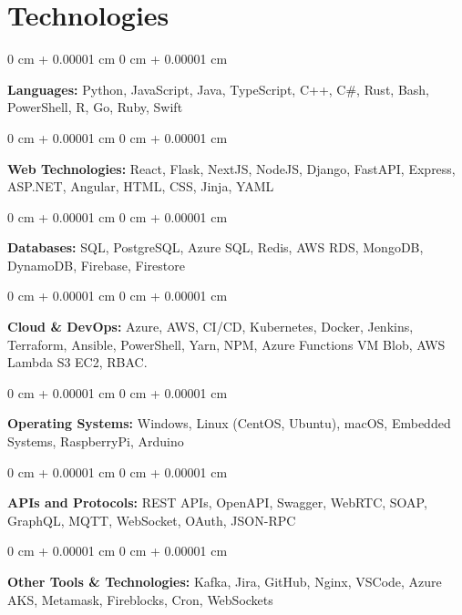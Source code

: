 \documentclass[10pt, letterpaper]{article}
\newenvironment{onecolentry}{
    \begin{adjustwidth}{
        0 cm + 0.00001 cm
    }{
        0 cm + 0.00001 cm
    }
}{
    \end{adjustwidth}
} %
\begin{document}
\section{Technologies}
\begin{onecolentry}
  \textbf{Languages:} Python, JavaScript, Java, TypeScript, C++, C\#, Rust, Bash, PowerShell, R, Go, Ruby, Swift
\end{onecolentry}
\begin{onecolentry}
  \textbf{Web Technologies:} React, Flask, NextJS, NodeJS, Django, FastAPI, Express, ASP.NET, Angular, HTML, CSS, Jinja, YAML
\end{onecolentry}
\begin{onecolentry}
  \textbf{Databases:} SQL, PostgreSQL, Azure SQL, Redis, AWS RDS, MongoDB, DynamoDB, Firebase, Firestore
\end{onecolentry}
\begin{onecolentry}
  \textbf{Cloud \& DevOps:} Azure, AWS, CI/CD, Kubernetes, Docker, Jenkins, Terraform, Ansible, PowerShell, Yarn, NPM, Azure Functions VM Blob, AWS Lambda S3 EC2, RBAC.
\end{onecolentry}
\begin{onecolentry}
  \textbf{Operating Systems:} Windows, Linux (CentOS, Ubuntu), macOS, Embedded Systems, RaspberryPi, Arduino
\end{onecolentry}
\begin{onecolentry}
  \textbf{APIs and Protocols:} REST APIs, OpenAPI, Swagger, WebRTC, SOAP, GraphQL, MQTT, WebSocket, OAuth, JSON-RPC
\end{onecolentry}
\begin{onecolentry}
  \textbf{Other Tools \& Technologies:} Kafka, Jira, GitHub, Nginx, VSCode, Azure AKS, Metamask, Fireblocks, Cron, WebSockets
\end{onecolentry}
\end{document}
